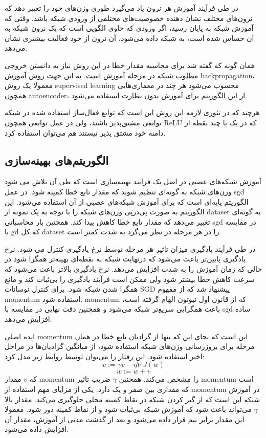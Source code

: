 در طی فرآیند آموزش هر نرون یاد می‌گیرد طوری وزن‌های خود را تغییر دهد که نرون‌های
مختلف نشان دهنده خصوصیت‌های مختلفی از ورودی شبکه‌ باشد. وقتی که آموزش شبکه به
پایان رسید، اگر ورودی که حاوی الگویی است که یک نرون شبکه به آن حساس شده است، به
شبکه داده می‌شود، آن نرون از خود فعالیت بیشتری نشان می‌دهد.

همان گونه که گفته شد برای محاسبه مقدار خطا در این روش نیاز به دانستن خروجی مطلوب
شبکه در مرحله آموزش است. به این جهت روش آموزش \gls{backpropagation}، معمولا یک
روش \gls{supervised learning} محسوب می‌شود هر چند در معماری‌هایی همچون
\gls{autoencoder}، از این الگوریتم برای آموزش بدون نظارت استفاده می‌شود.

هرچند که در تئوری لازمه این روش این است که توابع فعال‌ساز استفاده شده در شبکه
توابعی مشتق‌پذیر باشند، ولی در عمل توابعی همچون ReLU که در یک یا چند نقطه از
دامنه خود مشتق پذیر نیستند هم می‌توان استفاده کرد.

\subsection{الگوریتم‌های بهینه‌سازی}
آموزش شبکه‌های عصبی در اصل یک فرایند بهینه‌سازی است که طی آن تلاش می شود وزن‌های
شبکه به گونه‌ای تنظیم شوند که مقدار تابع خطا کمینه شود. در عمل \gls{sgd}
الگوریتم پایه‌ای است که برای آموزش شبکه‌های عصبی از آن استفاده می‌شود. این
الگوریتم به صورت پی‌درپی وزن‌های شبکه را با توجه به یک نمونه از \gls{dataset} به
گونه‌ای تغییر می‌دهد که مقدار تابع خطا کاهش پیدا کند. همچنین بار محاسباتی
\gls{sgd} در مقایسه با \gls{gd} که کل \gls{dataset} را در هر مرحله در نظر
می‌گرد به شدت کمتر است.

در طی فرآیند یادگیری میزان تاثیر هر مرحله توسط نرخ یادگیری کنترل می شود. نرخ
یادگیری پایین‌تر باعث می‌شود که درنهایت شبکه به نقطه‌ای بهینه‌تر همگرا شود در
حالی که زمان آموزش را به شدت افزایش می‌دهد. نرخ یادگیری بالاتر باعث می‌شود که
سرعت کاهش خطا بیشتر شود ولی ممکن است فرآیند یادگیری را بی‌ثبات کند و مانع همگرا
شدن شبکه شود. برای کنترل نوسانات \gls{SGD} پیشنهاد شد که از مفهوم \gls{momentum}
استفاده شود. \gls{momentum} که از قانون اول نیوتون الهام گرفته است، باعث همگرایی
سریع‌تر شبکه می‌شود و همچنین دقت نهایی در مقایسه با \gls{sgd} ساده افزایش می‌دهد.

ایده اصلی \gls{momentum} این است که بجای این که تنها از گرادیان تابع خطا در همان
مرحله برای بروزرسانی وزن‌های شبکه استفاده شود، از میانگین گرادیان‌ها در مراحل
اخیر استفاده شود. این رفتار را می‌توان توسط روابط زیر مدل کرد:
\begin{equation}
    v := \gamma v - \eta \nabla J(w)
\end{equation}
\begin{equation}
    w := w + v
\end{equation}
که $v$ مقدار \gls{momentum} را مشخص می‌کند. همچنین $\gamma$ ضریب تاثیر
\gls{momentum} است که مقداری بین صفر و یک دارد. یکی از مزایای مهم استفاده از
\gls{momentum} در آموزش شبکه این است که از گیر کردن شبکه در نقاط کمینه محلی
جلوگیری می‌کند. مقدار بالا $\gamma$ می‌تواند باعث شود که آموزش شبکه بی‌ثبات شود
و از نقاط کمینه دور شود. معمولا این مقدار برابر نیم قرار داده می‌شود و بعد از
گذشت مدتی از آموزش، مقدار آن افزایش داده می‌شود.

